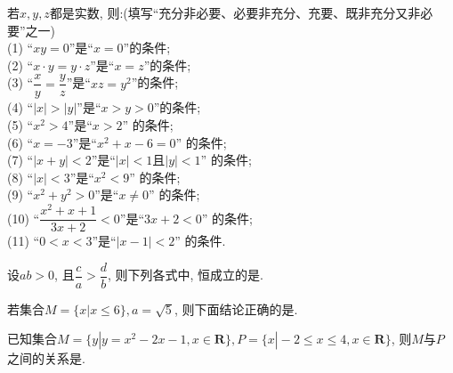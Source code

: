 \item 若$x,y,z$都是实数, 则:(填写``充分非必要、必要非充分、充要、既非充分又非必要''之一)\\
(1) ``$xy=0$''是``$x=0$''的条件;\\
(2) ``$x\cdot y=y\cdot z$''是``$x=z$''的条件;\\
(3) ``$\dfrac xy=\dfrac yz$''是``$xz=y^2$''的条件;\\
(4) ``$|x |>| y|$''是``$x>y>0$''的条件;\\
(5) ``$x^2>4$''是``$x>2$'' 的条件;\\
(6) ``$x=-3$''是``$x^2+x-6=0$'' 的条件;\\
(7) ``$|x+y|<2$''是``$|x|<1$且$|y|<1$'' 的条件;\\
(8) ``$|x|<3$''是``$x^2<9$'' 的条件;\\
(9) ``$x^2+y^2>0$''是``$x\ne 0$'' 的条件;\\
(10) ``$\dfrac{x^2+x+1}{3x+2}<0$''是``$3x+2<0$'' 的条件;\\
(11) ``$0<x<3$''是``$|x-1|<2$'' 的条件.


\item 设$ab>0$, 且$\dfrac ca>\dfrac db$, 则下列各式中, 恒成立的是.

\item 若集合$M=\{x |x\le 6\},a=\sqrt 5$, 则下面结论正确的是.

\item 已知集合$M=\{y |y=x^2-2x-1,x\in \mathbf{R}\},P=\{x |-2\le x\le 4,x\in \mathbf{R}\}$, 则$M$与$P$之间的关系是.
